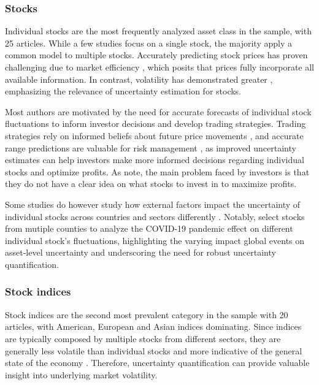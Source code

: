 \subsubsection{Stocks}
Individual stocks are the most frequently analyzed asset class in the sample, with 25 articles. While a few studies focus on a single stock, the majority apply a common model to multiple stocks. Accurately predicting stock prices has proven challenging due to market efficiency \parencite{fama1970efficient}, which posits that prices fully incorporate all available information. In contrast, volatility has demonstrated greater  \parencite{poon2003forecasting}, emphasizing the relevance of uncertainty estimation for stocks. 

Most authors are motivated by the need for accurate forecasts of individual stock fluctuations to inform investor decisions and develop trading strategies. Trading strategies rely on informed beliefs about future price movements \parencite{vuletic2024finGAN}, and accurate range predictions are valuable for risk management \parencite{Li2024DeepAR}, as improved uncertainty estimates can help investors make more informed decisions regarding individual stocks and optimize profits. As \cite{govindasamy2014prediction} note, the main problem faced by investors is that they do not have a clear idea on what stocks to invest in to maximize profits.  

Some studies do however study how external factors impact the uncertainty of individual stocks across countries and sectors differently \parencite{chandra2021bayesian, soleymani2022longterm}. Notably, \cite{chandra2021bayesian} select stocks from mutiple counties to analyze the COVID-19 pandemic effect on different individual stock's fluctuations, highlighting the varying impact global events on asset-level uncertainty and underscoring the need for robust uncertainty quantification. 

\subsubsection{Stock indices}
Stock indices are the second most prevalent category in the sample with 20 articles, with American, European and Asian indices dominating. Since indices are typically composed by multiple stocks from different sectors, they are generally less volatile than individual stocks and more indicative of the general state of the economy \parencite{sezer2020financial}. Therefore, uncertainty quantification can provide valuable insight into underlying market volatility. 

